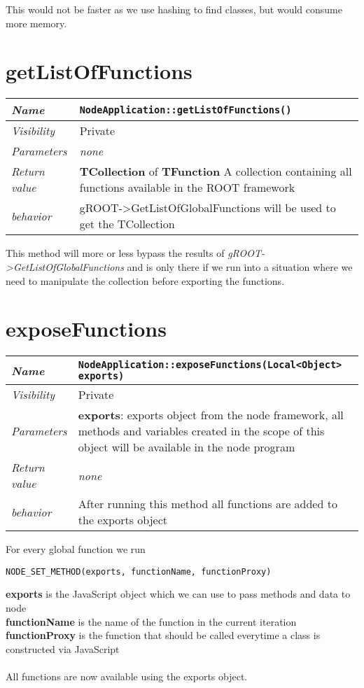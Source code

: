This would not be faster as we use hashing to find classes, but would consume more memory.
\newpage
\section{getListOfFunctions}
\begin{longtable}{p{3cm} @{\hskip 1cm} p{12cm}}
  \hline
  \textit{Name} & \texttt{NodeApplication::getListOfFunctions()} \\
  \hline
  \textit{Visibility} & Private \\
  \hline
  \textit{Parameters} & \textit{none} \\
  \hline
  \textit{Return value} & \textbf{TCollection} of \textbf{TFunction} A collection containing all functions available in the ROOT framework \\
  \hline
  \textit{behavior} & gROOT->GetListOfGlobalFunctions will be used to get the TCollection \\
  \hline
\end{longtable}
This method will more or less bypass the results of \textit{gROOT->GetListOfGlobalFunctions} and is only there if we run into a situation where we need to manipulate the collection before exporting the functions.
\newpage
\section{exposeFunctions}
\begin{longtable}{p{3cm} @{\hskip 1cm} p{12cm}}
  \hline
  \textit{Name} & \texttt{NodeApplication::exposeFunctions(Local<Object> exports)} \\
  \hline
  \textit{Visibility} & Private \\
  \hline
  \textit{Parameters} & \textbf{exports}: exports object from the node framework, all methods and variables created in the scope of this object will be available in the node program \\
  \hline
  \textit{Return value} & \textit{none} \\
  \hline
  \textit{behavior} & After running this method all functions are added to the exports object \\
  \hline
\end{longtable}

For every global function we run
\begin{verbatim}
NODE_SET_METHOD(exports, functionName, functionProxy)
\end{verbatim}

\textbf{exports} is the JavaScript object which we can use to pass methods and data to node \\
\textbf{functionName} is the name of the function in the current iteration\\
\textbf{functionProxy} is the function that should be called everytime a class is constructed via JavaScript\\
\\
All functions are now available using the exports object.
\newpage
